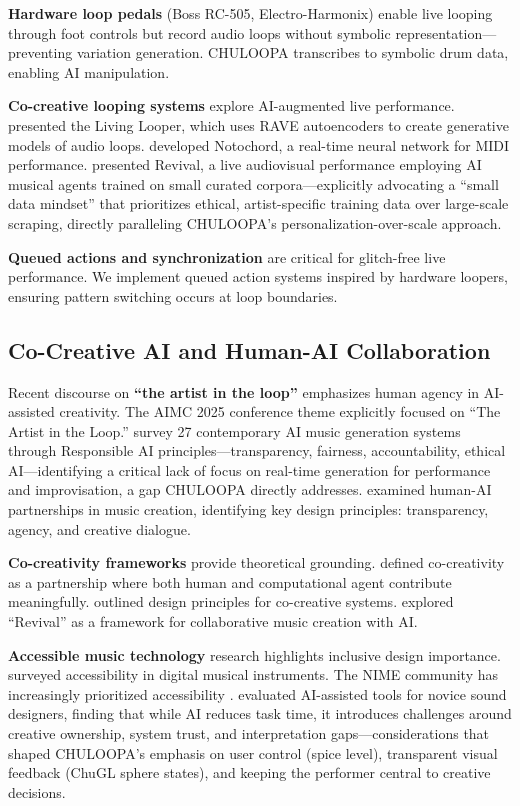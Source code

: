 \documentclass{aimc2026}
\begin{document}
\textbf{Hardware loop pedals} (Boss RC-505, Electro-Harmonix) enable live looping through foot controls but record audio loops without symbolic representation---preventing variation generation. CHULOOPA transcribes to symbolic drum data, enabling AI manipulation.

\textbf{Co-creative looping systems} explore AI-augmented live performance. \citet{shepardson2023living} presented the Living Looper, which uses RAVE autoencoders to create generative models of audio loops. \citet{sturm2019notochord} developed Notochord, a real-time neural network for MIDI performance. \citet{lee2025revival} presented Revival, a live audiovisual performance employing AI musical agents trained on small curated corpora---explicitly advocating a ``small data mindset'' that prioritizes ethical, artist-specific training data over large-scale scraping, directly paralleling CHULOOPA's personalization-over-scale approach.

\textbf{Queued actions and synchronization} are critical for glitch-free live performance. We implement queued action systems inspired by hardware loopers, ensuring pattern switching occurs at loop boundaries.

\subsection{Co-Creative AI and Human-AI Collaboration}

Recent discourse on \textbf{``the artist in the loop''} emphasizes human agency in AI-assisted creativity. The AIMC 2025 conference theme explicitly focused on ``The Artist in the Loop.'' \citet{wilson2025responsible} survey 27 contemporary AI music generation systems through Responsible AI principles---transparency, fairness, accountability, ethical AI---identifying a critical lack of focus on real-time generation for performance and improvisation, a gap CHULOOPA directly addresses. \citet{loughran2020human} examined human-AI partnerships in music creation, identifying key design principles: transparency, agency, and creative dialogue.

\textbf{Co-creativity frameworks} provide theoretical grounding. \citet{lubart2005creativity} defined co-creativity as a partnership where both human and computational agent contribute meaningfully. \citet{davis2013role} outlined design principles for co-creative systems. \citet{martin2021revival} explored ``Revival'' as a framework for collaborative music creation with AI.

\textbf{Accessible music technology} research highlights inclusive design importance. \citet{knotts2014accessible} surveyed accessibility in digital musical instruments. The NIME community has increasingly prioritized accessibility \citep{hodl2020accessibility,parkinson2020inclusive}. \citet{liu2025aime} evaluated AI-assisted tools for novice sound designers, finding that while AI reduces task time, it introduces challenges around creative ownership, system trust, and interpretation gaps---considerations that shaped CHULOOPA's emphasis on user control (spice level), transparent visual feedback (ChuGL sphere states), and keeping the performer central to creative decisions.
\end{document}
